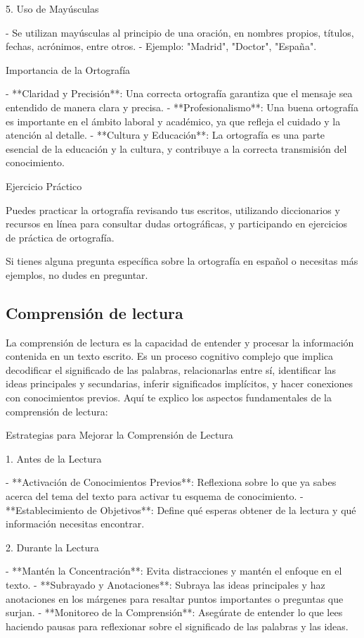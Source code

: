  5. Uso de Mayúsculas

- Se utilizan mayúsculas al principio de una oración, en nombres propios, títulos, fechas, acrónimos, entre otros.
  - Ejemplo: "Madrid", "Doctor", "España".

 Importancia de la Ortografía

- **Claridad y Precisión**: Una correcta ortografía garantiza que el mensaje sea entendido de manera clara y precisa.
- **Profesionalismo**: Una buena ortografía es importante en el ámbito laboral y académico, ya que refleja el cuidado y la atención al detalle.
- **Cultura y Educación**: La ortografía es una parte esencial de la educación y la cultura, y contribuye a la correcta transmisión del conocimiento.

 Ejercicio Práctico

Puedes practicar la ortografía revisando tus escritos, utilizando diccionarios y recursos en línea para consultar dudas ortográficas, y participando en ejercicios de práctica de ortografía.

Si tienes alguna pregunta específica sobre la ortografía en español o necesitas más ejemplos, no dudes en preguntar.

\subsection{Comprensión de lectura}

La comprensión de lectura es la capacidad de entender y procesar la información contenida en un texto escrito. Es un proceso cognitivo complejo que implica decodificar el significado de las palabras, relacionarlas entre sí, identificar las ideas principales y secundarias, inferir significados implícitos, y hacer conexiones con conocimientos previos. Aquí te explico los aspectos fundamentales de la comprensión de lectura:

 Estrategias para Mejorar la Comprensión de Lectura

 1. Antes de la Lectura

- **Activación de Conocimientos Previos**: Reflexiona sobre lo que ya sabes acerca del tema del texto para activar tu esquema de conocimiento.
- **Establecimiento de Objetivos**: Define qué esperas obtener de la lectura y qué información necesitas encontrar.

 2. Durante la Lectura

- **Mantén la Concentración**: Evita distracciones y mantén el enfoque en el texto.
- **Subrayado y Anotaciones**: Subraya las ideas principales y haz anotaciones en los márgenes para resaltar puntos importantes o preguntas que surjan.
- **Monitoreo de la Comprensión**: Asegúrate de entender lo que lees haciendo pausas para reflexionar sobre el significado de las palabras y las ideas.

